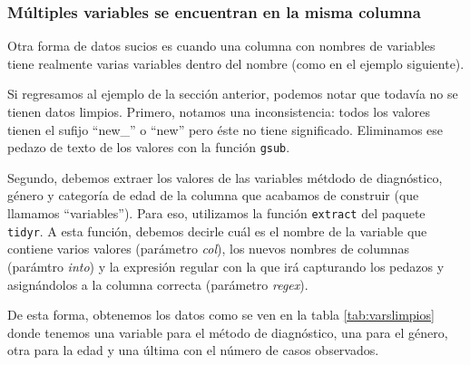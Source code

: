 \documentclass[]{article}
\newenvironment{Shaded}{\begin{snugshade}}{\end{snugshade}}
\newcommand{\KeywordTok}[1]{\textcolor[rgb]{0.13,0.29,0.53}{\textbf{#1}}}
\newcommand{\DataTypeTok}[1]{\textcolor[rgb]{0.13,0.29,0.53}{#1}}
\newcommand{\StringTok}[1]{\textcolor[rgb]{0.31,0.60,0.02}{#1}}
\newcommand{\OperatorTok}[1]{\textcolor[rgb]{0.81,0.36,0.00}{\textbf{#1}}}
\newcommand{\NormalTok}[1]{#1}
\begin{document}
\subsubsection{Múltiples variables se encuentran en la misma
columna}\label{multiples-variables-se-encuentran-en-la-misma-columna}

Otra forma de datos sucios es cuando una columna con nombres de
variables tiene realmente varias variables dentro del nombre (como en el
ejemplo siguiente).

Si regresamos al ejemplo de la sección anterior, podemos notar que
todavía no se tienen datos limpios. Primero, notamos una inconsistencia:
todos los valores tienen el sufijo ``new\_'' o ``new'' pero éste no
tiene significado. Eliminamos ese pedazo de texto de los valores con la
función \texttt{gsub}.

Segundo, debemos extraer los valores de las variables métdodo de
diagnóstico, género y categoría de edad de la columna que acabamos de
construir (que llamamos ``variables''). Para eso, utilizamos la función
\texttt{extract} del paquete \texttt{tidyr}. A esta función, debemos
decirle cuál es el nombre de la variable que contiene varios valores
(parámetro \emph{col}), los nuevos nombres de columnas (parámtro
\emph{into}) y la expresión regular con la que irá capturando los
pedazos y asignándolos a la columna correcta (parámetro \emph{regex}).

\begin{Shaded}
\end{Shaded}

De esta forma, obtenemos los datos como se ven en la tabla
\ref{tab:varslimpios} donde tenemos una variable para el método de
diagnóstico, una para el género, otra para la edad y una última con el
número de casos observados.
\end{document}
